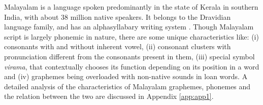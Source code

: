 



Malayalam is a language spoken predominantly in the state of Kerala in southern India, with about 38 million native speakers. It belongs to the Dravidian language family, and has an alphasyllabary writing system
\cite{bri1999typology}. Though Malayalam script is largely phonemic in nature, there are some unique characteristics like: (i) consonants with and without inherent vowel, (ii) consonant clusters with pronunciation different from the consonants present in them, (iii) special symbol \textit{virama}, that contextually chooses its function depending on its position in a word and (iv) graphemes being overloaded with non-native sounds in loan words. A detailed analysis of the characteristics of Malayalam graphemes, phonemes and the relation between the two are discussed in Appendix \ref{app:app1}.

